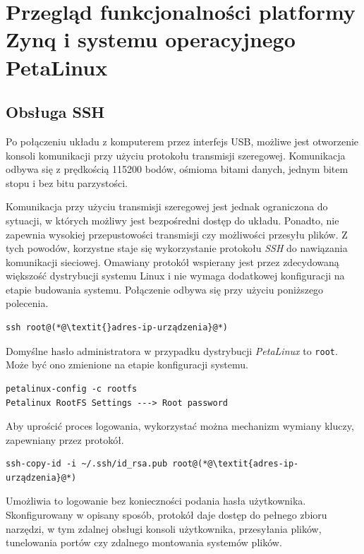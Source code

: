 \chapter{Przegląd funkcjonalności platformy Zynq i systemu operacyjnego PetaLinux}
\label{cha:functionalities}

\section{Obsługa SSH}
\label{sec:ssh}
Po połączeniu układu z komputerem przez interfejs USB, możliwe jest otworzenie konsoli komunikacji przy użyciu protokołu transmisji szeregowej. Komunikacja odbywa się z prędkością 115200 bodów, ośmioma bitami danych, jednym bitem stopu i bez bitu parzystości.

Komunikacja przy użyciu transmisji szeregowej jest jednak ograniczona do sytuacji, w których możliwy jest bezpośredni dostęp do układu. Ponadto, nie zapewnia wysokiej przepustowości transmisji czy możliwości przesyłu plików. Z tych powodów, korzystne staje się wykorzystanie protokołu \emph{SSH} do nawiązania komunikacji sieciowej.
Omawiany protokół wspierany jest przez zdecydowaną większość dystrybucji systemu Linux i nie wymaga dodatkowej konfiguracji na etapie budowania systemu. Połączenie odbywa się przy użyciu poniższego polecenia.

\begin{lstlisting}[breaklines=true]
ssh root@(*@\textit{}adres-ip-urządzenia}@*)
\end{lstlisting}

Domyślne hasło administratora w przypadku dystrybucji \emph{PetaLinux} to \texttt{root}. Może być ono zmienione na etapie konfiguracji systemu.


\begin{lstlisting}[breaklines=true]
petalinux-config -c rootfs
Petalinux RootFS Settings ---> Root password
\end{lstlisting}

Aby uprościć proces logowania, wykorzystać można mechanizm wymiany kluczy, zapewniany przez protokół.

\begin{lstlisting}[breaklines=true]
ssh-copy-id -i ~/.ssh/id_rsa.pub root@(*@\textit{adres-ip-urządzenia}@*)
\end{lstlisting}

Umożliwia to logowanie bez konieczności podania hasła użytkownika. Skonfigurowany w opisany sposób, protokół daje dostęp do pełnego zbioru narzędzi, w tym zdalnej obsługi konsoli użytkownika, przesyłania plików, tunelowania portów czy zdalnego montowania systemów plików.
